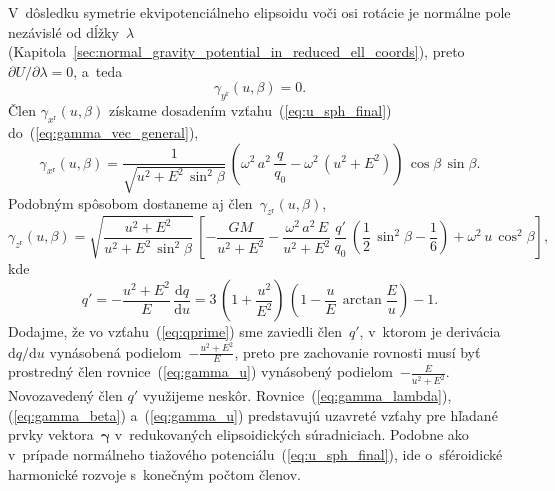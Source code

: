 \documentclass[a4paper, 12pt]{book}
\newcommand{\diff}{\mathrm d}
\begin{document}
V~dôsledku symetrie ekvipotenciálneho elipsoidu voči osi rotácie je normálne 
pole nezávislé od dĺžky~$\lambda$ 
(Kapitola~\ref{sec:normal_gravity_potential_in_reduced_ell_coords}), 
preto~$\partial U \slash \partial \lambda = 0$, a~teda
%
\begin{equation}
\label{eq:gamma_lambda}
\gamma_{y^\mathrm{r}}(u, \beta) = 0{.}
\end{equation}
%
Člen $\gamma_{x^\mathrm{r}}(u, \beta)$ získame dosadením 
vzťahu~(\ref{eq:u_sph_final}) do~(\ref{eq:gamma_vec_general}),
%
\begin{equation}
\label{eq:gamma_beta}
\gamma_{x^\mathrm{r}}(u, \beta) = \frac{1}{\sqrt{u^2 + E^2 \, \sin^2\beta}} \, 
\left( \omega^2 \, a^2 \, \frac{q}{q_0} - \omega^2 \, (u^2 + E^2) \right) \, 
\cos\beta \, \sin\beta{.}
\end{equation}
%
Podobným spôsobom dostaneme aj člen~$\gamma_{z^\mathrm{r}}(u, \beta)$,
%
\begin{equation}
\label{eq:gamma_u}
\gamma_{z^\mathrm{r}}(u, \beta) = \sqrt{\dfrac{u^2 + E^2}{u^2 + E^2 \, 
\sin^2\beta}} \, \left[ -\frac{GM}{u^2 + E^2} - \frac{\omega^2 \, a^2 \, E}{u^2 
+ E^2} \, \frac{q'}{q_0} \, \left( \frac{1}{2} \, \sin^2\beta - \frac{1}{6} 
\right) + \omega^2 \, u \, \cos^2\beta \right]{,}
\end{equation}
%
kde \parencite{MoritzPhysicalGeodesy}
%
\begin{equation}
\label{eq:qprime}
q' = -\frac{u^2 + E^2}{E} \, \frac{\diff q}{\diff u} = 3 \, \left( 
1 + \frac{u^2}{E^2} \right) \, \left(  1 - \frac{u}{E} \, \arctan\frac{E}{u} 
\right) - 1{.}
\end{equation}
%
Dodajme, že vo vzťahu~(\ref{eq:qprime}) sme zaviedli člen~$q'$, v~ktorom je 
derivácia~$\diff q \slash \diff u$ vynásobená podielom~$-\frac{u^2 + E^2}{E}$, 
preto pre zachovanie rovnosti musí byť prostredný člen 
rovnice~(\ref{eq:gamma_u}) vynásobený podielom~$-\frac{E}{u^2 + E^2}$.  
Novozavedený člen $q'$ využijeme neskôr.  Rovnice~(\ref{eq:gamma_lambda}), 
(\ref{eq:gamma_beta}) a~(\ref{eq:gamma_u}) predstavujú uzavreté vzťahy pre 
hľadané prvky vektora~$\boldsymbol \gamma$ v~redukovaných elipsoidických 
súradniciach.  Podobne ako v~prípade normálneho tiažového 
potenciálu~(\ref{eq:u_sph_final}), ide o~sféroidické harmonické rozvoje 
s~konečným počtom členov.
\end{document}
